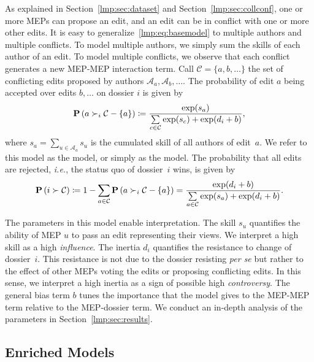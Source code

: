 As explained in Section~\ref{lmp:sec:dataset} and Section~\ref{lmp:sec:collconf}, one or more MEPs can propose an edit, and an edit can be in conflict with one or more other edits.
It is easy to generalize~\eqref{lmp:eq:basemodel} to multiple authors and multiple conflicts.
To model multiple authors, we simply sum the skills of each author of an edit.
To model multiple conflicts, we observe that each conflict generates a new MEP-MEP interaction term.
Call \mbox{$\mathcal{C} = \{ a, b, \dots \}$} the set of conflicting edits proposed by authors $ \mathcal{A}_a, \mathcal{A}_b, \dots $.
The probability of edit $a$ being accepted over edits $b, \dots$ on dossier $i$ is given by
\begin{equation}
	\label{lmp:eq:wowmodel}
	\mathbf{P}\left(  a \succ_i \mathcal{C} - \{ a\}  \right) \coloneqq
	\frac{\exp(s_a) }{ \sum\limits_{c \in \mathcal{C} } \exp(s_c) + \exp(d_i + b) },
\end{equation}
where $s_a = \sum_{u \in \mathcal{A}_a} s_u$ is the cumulated skill of all authors of edit~$a$.
We refer to this model as the \warofwords{} model, or simply as the \wow{} model.
The probability that all edits are rejected, \textit{i.e.}, the status quo of dossier~$i$ wins, is given by
\begin{equation*}
	\mathbf{P}\left( i \succ \mathcal{C}  \right)
	\coloneqq 1 - \sum_{a \in \mathcal{C} } \mathbf{P}\left(  a \succ_i \mathcal{C} - \{ a \} \right)
	= \frac{\exp(d_i + b) }{ \sum\limits_{a \in \mathcal{C} } \exp(s_a) + \exp(d_i + b) }.
\end{equation*}

The parameters in this model enable interpretation.
The skill $s_u$ quantifies the ability of MEP $u$ to pass an edit representing their views.
We interpret a high skill as a high \textit{influence}.
The inertia $d_i$ quantifies the resistance to change of dossier~$i$.
This resistance is not due to the dossier resisting \textit{per se} but rather to the effect of other MEPs voting the edits or proposing conflicting edits.
In this sense, we interpret a high inertia as a sign of possible high \textit{controversy}.
The general bias term $b$ tunes the importance that the model gives to the MEP-MEP term relative to the MEP-dossier term.
We conduct an in-depth analysis of the parameters in Section~\ref{lmp:sec:results}.


\subsection{Enriched Models}
\label{lmp:sec:enriched}


